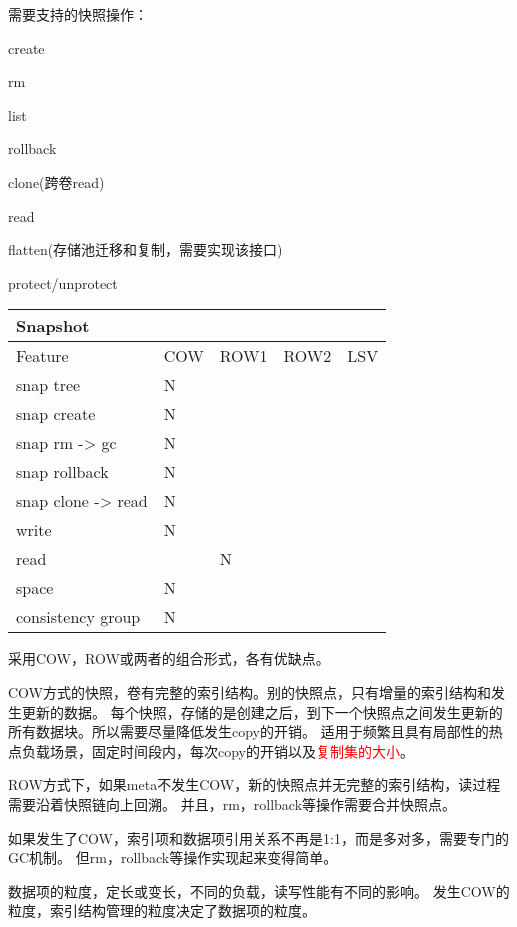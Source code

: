 需要支持的快照操作：
\begin{enumbox}
\item create
\item rm
\item list
\item rollback
\item clone(跨卷read)
\item read
\item flatten(存储池迁移和复制，需要实现该接口)
\item protect/unprotect
\end{enumbox}

\begin{tabular}{|s|p{0.6cm}|p{0.6cm}|p{0.6cm}|p{0.6cm}| }
    \hline
      {Snapshot} \\
    \hline
    Feature & COW & ROW1 & ROW2 & LSV \\
    \hline
    snap tree & N &  & & \\
    \hline
    snap create & N &  & & \\
    \hline
    snap rm -> gc & N &  & & \\
    \hline
    snap rollback & N &  & & \\
    \hline
    snap clone -> read & N & & & \\
    \hline
    write & N &  & & \\
    \hline
    read & & N & & \\
    \hline
    space & N &  & & \\
    \hline
    consistency group & N &  & & \\
    \hline
\end{tabular}

采用COW，ROW或两者的组合形式，各有优缺点。

COW方式的快照，卷有完整的索引结构。别的快照点，只有增量的索引结构和发生更新的数据。
每个快照，存储的是创建之后，到下一个快照点之间发生更新的所有数据块。所以需要尽量降低发生copy的开销。
适用于频繁且具有局部性的热点负载场景，固定时间段内，每次copy的开销以及\textcolor{red}{复制集的大小}。

ROW方式下，如果meta不发生COW，新的快照点并无完整的索引结构，读过程需要沿着快照链向上回溯。
并且，rm，rollback等操作需要合并快照点。

如果发生了COW，索引项和数据项引用关系不再是1:1，而是多对多，需要专门的GC机制。
但rm，rollback等操作实现起来变得简单。

数据项的粒度，定长或变长，不同的负载，读写性能有不同的影响。
发生COW的粒度，索引结构管理的粒度决定了数据项的粒度。

